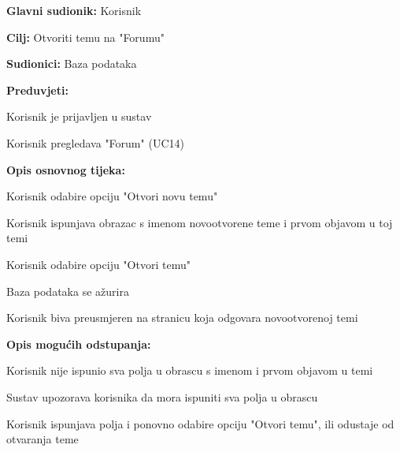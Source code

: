 					
					\noindent {}
                    \begin{packed_item}
    
                        \item \textbf{Glavni sudionik: }Korisnik
                        \item  \textbf{Cilj:} Otvoriti temu na "Forumu"
                        \item  \textbf{Sudionici:} Baza podataka
                        \item  \textbf{Preduvjeti:}
						\item[] \begin{packed_enum}
							\item Korisnik je prijavljen u sustav
							\item Korisnik pregledava "Forum" (UC14)
						\end{packed_enum}
                        \item  \textbf{Opis osnovnog tijeka:}
                        
                        \item[] \begin{packed_enum}
    
                            \item Korisnik odabire opciju "Otvori novu temu"
                            \item Korisnik ispunjava obrazac s imenom novootvorene teme i prvom objavom u toj temi
                            \item Korisnik odabire opciju "Otvori temu"
                            \item Baza podataka se ažurira
                            \item Korisnik biva preusmjeren na stranicu koja odgovara novootvorenoj temi
                        \end{packed_enum}
                        
                        \item  \textbf{Opis mogućih odstupanja:}
						
						\item[] \begin{packed_item}
						\item[3.a] Korisnik nije ispunio sva polja u obrascu s imenom i prvom objavom u temi
							\item[] \begin{packed_enum}
								
								\item Sustav upozorava korisnika da mora ispuniti sva polja u obrascu
								\item Korisnik ispunjava polja i ponovno odabire opciju "Otvori temu", ili odustaje od otvaranja teme
								
							\end{packed_enum}
                    		\end{packed_item}	
                    	\end{packed_item}				
					
